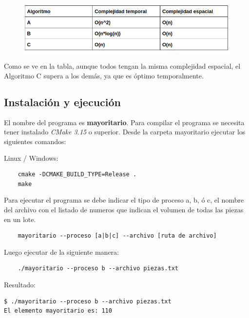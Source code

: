 \documentclass{article}
\begin{document}
\begin{figure}[h!]
    \includegraphics[width=\linewidth]{comparacion.png}
\end{figure}


Como se ve en la tabla, aunque todos tengan la misma complejidad espacial, el Algoritmo C supera a los demás, ya que es óptimo temporalmente.

\newpage
\subsection{Instalación y ejecución}

El nombre del programa es \textbf{mayoritario}. Para compilar el programa se necesita tener 
instalado \textit{CMake 3.15} o superior. 
Desde la carpeta mayoritario ejecutar los siguientes comandos:

Linux / Windows:

\begin{lstlisting}
    cmake -DCMAKE_BUILD_TYPE=Release .
    make    
\end{lstlisting}


Para ejecutar el programa se debe indicar el tipo de proceso a, b, ó c, el nombre del archivo con el listado de numeros 
que indican el volumen de todas las piezas en un lote.

\begin{lstlisting}
    mayoritario --proceso [a|b|c] --archivo [ruta de archivo]
\end{lstlisting}

Luego ejecutar de la siguiente manera:

\begin{lstlisting}
    ./mayoritario --proceso b --archivo piezas.txt
\end{lstlisting}

Resultado:
\begin{lstlisting}
$ ./mayoritario --proceso b --archivo piezas.txt
El elemento mayoritario es: 110    
\end{lstlisting}
\end{document}
